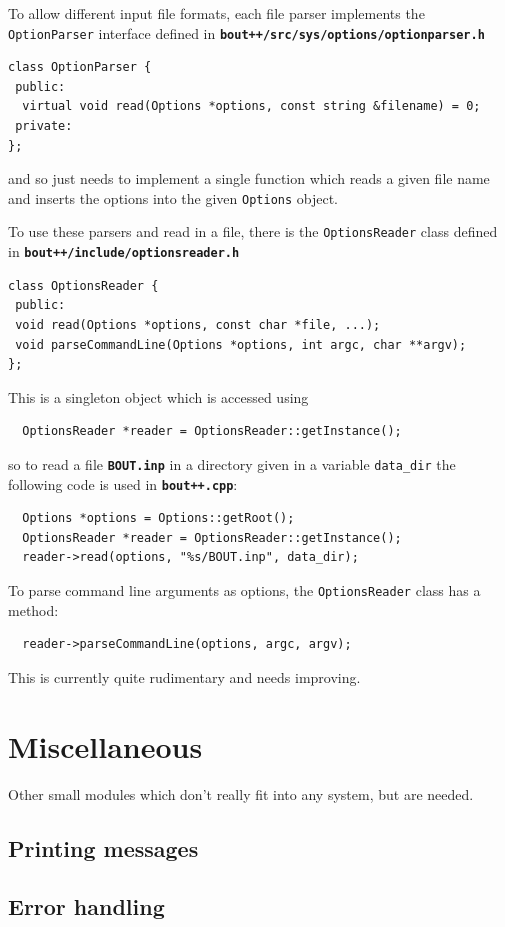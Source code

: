 \documentclass[12pt]{article}
\newcommand{\file}[1]{\texttt{\bf #1}}
\begin{document}
To allow different input file formats, each file parser implements
the \lstinline!OptionParser! interface defined in
\file{bout++/src/sys/options/optionparser.h}
\begin{lstlisting}
class OptionParser {
 public:
  virtual void read(Options *options, const string &filename) = 0;
 private:
};
\end{lstlisting}
and so just needs to implement a single function which reads a
given file name and inserts the options into the given \lstinline!Options!
object.

To use these parsers and read in a file, there is the
\lstinline!OptionsReader! class defined in
\file{bout++/include/optionsreader.h} 
\begin{lstlisting}
class OptionsReader {
 public:
 void read(Options *options, const char *file, ...);
 void parseCommandLine(Options *options, int argc, char **argv);
};
\end{lstlisting}
This is a singleton object which is accessed using
\begin{lstlisting}
  OptionsReader *reader = OptionsReader::getInstance();
\end{lstlisting}
so to read a file \file{BOUT.inp} in a directory given in a variable
\lstinline!data_dir! the following code is used in \file{bout++.cpp}:
\begin{lstlisting}
  Options *options = Options::getRoot();
  OptionsReader *reader = OptionsReader::getInstance();
  reader->read(options, "%s/BOUT.inp", data_dir);
\end{lstlisting}

To parse command line arguments as options, the \lstinline!OptionsReader!
class has a method:
\begin{lstlisting}
  reader->parseCommandLine(options, argc, argv);
\end{lstlisting}
This is currently quite rudimentary and needs improving.

\section{Miscellaneous}

Other small modules which don't really fit into any system, but are needed.


\subsection{Printing messages}


\subsection{Error handling}




\printindex
\end{document}
